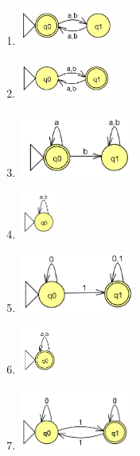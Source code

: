 \documentclass[12pt]{article}
\begin{document}
\begin{enumerate}
\item
\includegraphics[width=0.25\textwidth]{../../../images/DFAs/ex1_q5.png}\\

\item
\includegraphics[width=0.25\textwidth]{../../../images/DFAs/ex1_q6.png}\\

\item
\includegraphics[width=0.3\textwidth]{../../../images/DFAs/ex1_q7.png}\\

\item
\includegraphics[width=0.1\textwidth]{../../../images/DFAs/ex1_q8.png}\\

\item
\includegraphics[width=0.3\textwidth]{../../../images/DFAs/ex1_q9.png}\\

\item
\includegraphics[width=0.1\textwidth]{../../../images/DFAs/ex1_q10.png}

\item
\includegraphics[width=0.3\textwidth]{../../../images/DFAs/ex1_q11.png}


\end{enumerate}
\end{document}
